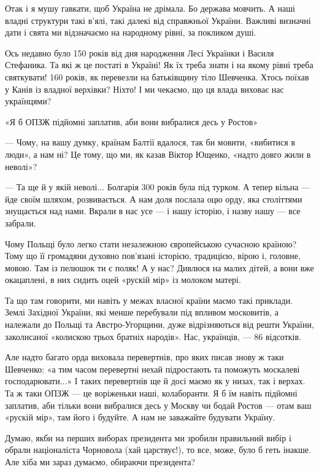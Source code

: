 \begin{longtable}
Отак і я мушу гавкати, щоб Україна не дрімала. Бо держава мовчить. А наші
владні структури такі в’ялі, такі далекі від справжньої України. Важливі
визначні дати і свята ми відзначаємо на народному рівні, за покликом душі.

Ось недавно було 150 років від дня народження Лесі Українки і Василя Стефаника.
Та які ж це постаті в Україні! Як їх треба знати і на якому рівні треба
святкувати! 160 років, як перевезли на батьківщину тіло Шевченка. Хтось поїхав
у Канів із владної верхівки? Ніхто! І ми чекаємо, що ця влада виховає нас
українцями?

«Я б ОПЗЖ підйомні заплатив, аби вони вибралися десь у Ростов»

— Чому, на вашу думку, країнам Балтії вдалося, так би мовити, «вибитися в
люди», а нам ні? Це тому, що ми, як казав Віктор Ющенко, «надто довго жили в
неволі»?

— Та ще й у якій неволі... Болгарія 300 років була під турком. А тепер вільна —
йде своїм шляхом, розвивається. А нам доля послала оцю орду, яка століттями
знущається над нами. Вкрали в нас усе — і нашу історію, і назву нашу — все
забрали.


Чому Польщі було легко стати незалежною європейською сучасною країною? Тому що
її громадяни духовно пов’язані історією, традицією, вірою і, головне, мовою.
Там із пелюшок ти є поляк! А у нас? Дивлюся на малих дітей, а вони вже
окацаплені, в них сидить оцей «рускій мір» із молоком матері.


Та що там говорити, ми навіть у межах власної країни маємо такі приклади. Землі
Західної України, які менше перебували під впливом московитів, а належали до
Польщі та Австро-Угорщини, дуже відрізняються від решти України, заколисаної
«колискою трьох братніх народів». Нас, українців, — 86 відсотків.

Але надто багато орда виховала перевертнів, про яких писав знову ж таки
Шевченко: «а тим часом перевертні нехай підростають та поможуть москалеві
господарювати...» І таких перевертнів ще й досі маємо як у низах, так і верхах.
Та ж таки ОПЗЖ — це воріженьки наші, колаборанти. Я б їм навіть підйомні
заплатив, аби тільки вони вибралися десь у Москву чи бодай Ростов — отам ваш
«рускій мір», там його і будуйте. А нам не заважайте будувати Україну.


Думаю, якби на перших виборах президента ми зробили правильний вибір і обрали
націоналіста Чорновола (хай царствує!), то все, може, було б геть інакше. Але
хіба ми зараз думаємо, обираючи президента?


\end{longtable}
